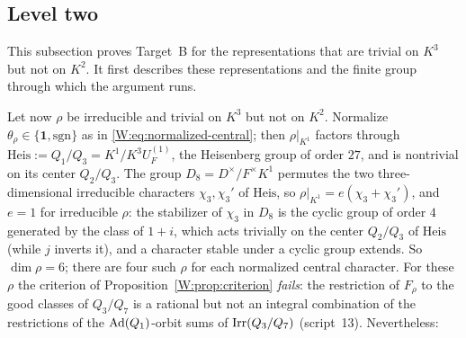 \subsection{Level two}\label{W:subsec:targetB}
This subsection proves Target~B for the representations that are trivial on $K^3$ but not on $K^2$. It first describes these representations and the finite group through which the argument runs.

Let now $\rho$ be irreducible and trivial on $K^3$ but not on $K^2$.
Normalize $\theta_\rho\in\{\mathbf1,\mathrm{sgn}\}$ as in
\eqref{W:eq:normalized-central}; then $\rho|_{K^1}$ factors through
$\mathrm{Heis}:=Q_1/Q_3=K^1/K^3U_F^{(1)}$, the Heisenberg group of order
$27$, and is nontrivial on its center $Q_2/Q_3$.  The group
$D_8=D^\times/F^\times K^1$ permutes the two three-dimensional
irreducible characters $\chi_3,\chi_3'$ of $\mathrm{Heis}$, so
$\rho|_{K^1}=e(\chi_3+\chi_3')$, and $e=1$ for irreducible $\rho$: the
stabilizer of $\chi_3$ in $D_8$ is the cyclic group of order $4$
generated by the class of $1+i$, which acts trivially on the center
$Q_2/Q_3$ of $\mathrm{Heis}$ (while $j$ inverts it), and a character
stable under a cyclic group extends.  So $\dim\rho=6$; there are four such $\rho$ for each normalized central
character.  For these $\rho$ the criterion of
Proposition~\ref{W:prop:criterion} \emph{fails}: the restriction of
$F_\rho$ to the good classes of $Q_3/Q_7$ is a rational but not an
integral combination of the restrictions of the $\operatorname{Ad}(Q_1)$-orbit sums of
$\operatorname{Irr}(Q_3/Q_7)$ (script~13).  Nevertheless:


